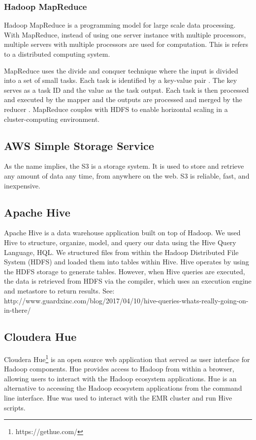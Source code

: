 \documentclass[journal]{IEEEtran}
\begin{document}
\subsubsection{Hadoop MapReduce}

Hadoop MapReduce is a programming model for large scale data processing. With MapReduce, instead of using one server instance with multiple 
processors, multiple servers with multiple processors are used for computation. This is refers to a distributed computing system.

MapReduce uses the divide and conquer technique where the input is divided into a set of small tasks. Each task is identified by a key-value 
pair \cite{Divide-and-Conquer}. The key serves as a task ID and the value as the task output. Each task is then processed and executed by the 
mapper and the outputs are processed and merged by the reducer \cite{MapReduce}. MapReduce couples with HDFS to enable horizontal
scaling in a cluster-computing environment.

\subsection{AWS Simple Storage Service}

As the name implies, the S3 is a storage system.
It is used to store and retrieve any amount of data any time, from anywhere on the web. 
S3 is reliable, fast, and inexpensive.

\subsection{Apache Hive}

Apache Hive is a data warehouse application built on top of Hadoop. We used Hive to structure, organize, model, and query our data using the Hive Query Language, HQL. We structured files from within the Hadoop Distributed File System (HDFS) and loaded them into tables within Hive. Hive operates by using the HDFS storage to generate tables. However, when Hive queries are executed, the data is retrieved from HDFS via the compiler, which uses an execution engine and metastore to return results. See: http://www.guardxinc.com/blog/2017/04/10/hive-queries-whats-really-going-on-in-there/

\subsection{Cloudera Hue}

Cloudera Hue\footnote{https://gethue.com/}
 is an open source web application that served as user interface for Hadoop components.
Hue provides access to Hadoop from within a browser, allowing users to interact with the Hadoop ecosystem applications. 
Hue is an alternative to accessing the Hadoop ecosystem applications from the command line interface.
Hue was used to interact with the EMR cluster and run Hive scripts.
\end{document}
